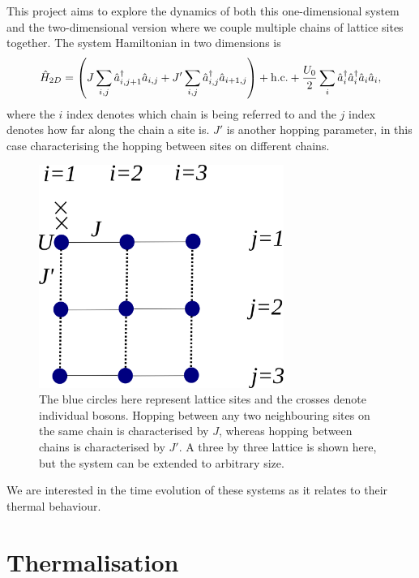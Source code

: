 \documentclass[prb, twocolumn, final]{revtex4-1}
\theoremstyle{plain}
\begin{document}
This project aims to explore the dynamics of both this one-dimensional system
and the two-dimensional version where we couple multiple chains of lattice
sites together. The system Hamiltonian in two dimensions is
\begin{equation}
    \hat{H}_{2D}
    =
    \left (
        J \sum_{i,j}{\hat{a}^{\dagger}_{i,j+1} \hat{a}_{i,j}} +
        J'\sum_{i,j}{\hat{a}^{\dagger}_{i,j} \hat{a}_{i+1,j}}
    \right) +
    \text{\text{h.c.}} +
    \frac{U_{0}}{2}
    \sum_{i}{\hat{a}^{\dagger}_{i}\hat{a}^{\dagger}_{i} \hat{a}_{i}\hat{a}_{i}},
\end{equation}
where the $i$ index denotes which chain is being referred to and the $j$ index
denotes how far along the chain a site is. $J'$ is another hopping parameter,
in this case characterising the hopping between sites on different chains.
\begin{figure}[H]
    \begin{center}
        \includegraphics[width=8cm]{./Figures/lattice_pic.png}
    \end{center}
    \caption{The blue circles here represent lattice sites and the crosses
             denote individual bosons. Hopping between any two neighbouring
             sites on the same chain is characterised by $J$, whereas hopping
             between chains is characterised by $J'$. A three by three lattice
             is shown here, but the system can be extended to arbitrary size.
            }
\end{figure}
We are interested in the time evolution of these systems as it relates to their
thermal behaviour.


\section{Thermalisation}
\end{document}

